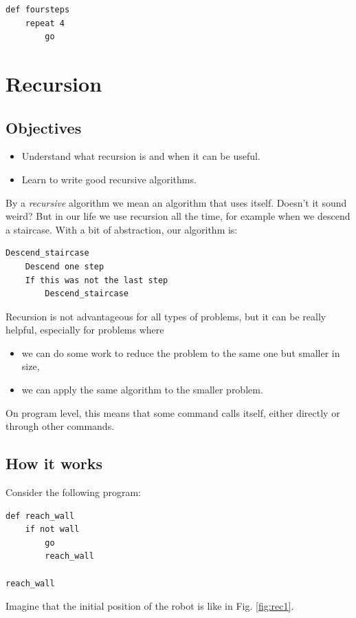 {\small
\begin{verbatim}
def foursteps
    repeat 4
        go
\end{verbatim}
}


\section{Recursion} \label{sec:recursion}

\subsection{Objectives} 
 
\begin{itemize}
\item Understand what recursion is and when it can be useful.
\item Learn to write good recursive algorithms.
\end{itemize}
By a {\em recursive} algorithm we mean an algorithm that uses itself. Doesn't it sound weird?
But in our life we use recursion all the time, for example when we descend a staircase.
With a bit of abstraction, our algorithm is:

\begin{verbatim}
Descend_staircase
    Descend one step
    If this was not the last step
        Descend_staircase
\end{verbatim}
Recursion is not advantageous for all types of problems, but it can be really 
helpful, especially for problems where 
\begin{itemize}
\item we can do some work to reduce the problem to the same one but smaller in size, 
\item we can apply the same algorithm to the smaller problem. 
\end{itemize}
On program level, this means that some command calls itself, either 
directly or through other commands.

\subsection{How it works} 

Consider the following program:
\begin{verbatim}
def reach_wall
    if not wall
        go
        reach_wall

reach_wall
\end{verbatim}
Imagine that the initial position of the robot is like in Fig. \ref{fig:rec1}.


